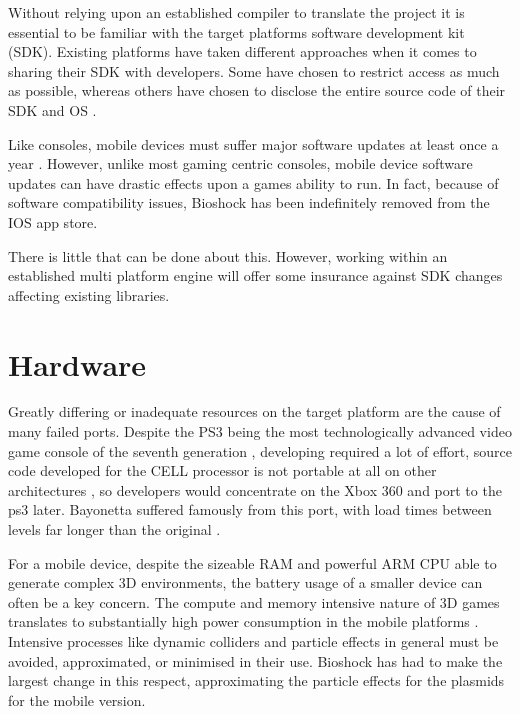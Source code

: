 \documentclass{scrartcl}
\begin{document}
{Without relying upon an established compiler to translate the project it is essential to be familiar with the target platforms software development kit (SDK).  Existing platforms have taken different approaches when it comes to sharing their SDK with developers. Some have chosen to restrict access as much as possible, whereas others have chosen to disclose the entire source code of their SDK and OS \cite {holzer2009trends}.

Like consoles, mobile devices must suffer major software updates at least once a year \cite {Android2017History}.  However, unlike most gaming centric consoles, mobile device software updates can have drastic effects upon a games ability to run.  In fact, because of software compatibility issues, Bioshock has been indefinitely removed from the IOS app store.

There is little that can be done about this.  However, working within an established multi platform engine will offer some insurance against SDK changes affecting existing libraries.

\section*{Hardware}

Greatly differing or inadequate resources on the target platform are the cause of many failed ports. Despite the PS3 being the most technologically advanced video game console of the seventh generation \cite {ofek2008sony}, developing required a lot of effort, source code developed for the CELL processor is not portable at all on other architectures \cite {buttari2007limitations}, so developers would concentrate on the Xbox 360 and port to the ps3 later.  Bayonetta suffered famously from this port, with load times between levels far longer than the original \cite {Kotaku2010Bayonetta}.

For a mobile device, despite the sizeable RAM and powerful ARM CPU able to generate complex 3D environments, the battery usage of a smaller device can often be a key concern.  The compute and memory intensive nature of 3D games translates to substantially high power consumption in the mobile platforms \cite {pathania2014integrated}.  Intensive processes like dynamic colliders and particle effects in general must be avoided, approximated, or minimised in their use. Bioshock has had to make the largest change in this respect, approximating the particle effects for the plasmids for the mobile version.\\

}
\end{document}
